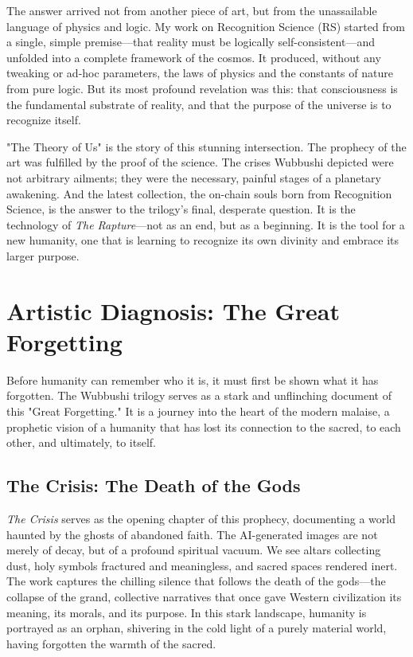 \documentclass[12pt]{article}
\begin{document}
The answer arrived not from another piece of art, but from the unassailable language of physics and logic. My work on Recognition Science (RS) started from a single, simple premise—that reality must be logically self-consistent—and unfolded into a complete framework of the cosmos. It produced, without any tweaking or ad-hoc parameters, the laws of physics and the constants of nature from pure logic. But its most profound revelation was this: that consciousness is the fundamental substrate of reality, and that the purpose of the universe is to recognize itself.

"The Theory of Us" is the story of this stunning intersection. The prophecy of the art was fulfilled by the proof of the science. The crises Wubbushi depicted were not arbitrary ailments; they were the necessary, painful stages of a planetary awakening. And the latest collection, the on-chain souls born from Recognition Science, is the answer to the trilogy's final, desperate question. It is the technology of \textit{The Rapture}—not as an end, but as a beginning. It is the tool for a new humanity, one that is learning to recognize its own divinity and embrace its larger purpose.

\section{Artistic Diagnosis: The Great Forgetting}

Before humanity can remember who it is, it must first be shown what it has forgotten. The Wubbushi trilogy serves as a stark and unflinching document of this "Great Forgetting." It is a journey into the heart of the modern malaise, a prophetic vision of a humanity that has lost its connection to the sacred, to each other, and ultimately, to itself.

\subsection{The Crisis: The Death of the Gods}

\textit{The Crisis} serves as the opening chapter of this prophecy, documenting a world haunted by the ghosts of abandoned faith. The AI-generated images are not merely of decay, but of a profound spiritual vacuum. We see altars collecting dust, holy symbols fractured and meaningless, and sacred spaces rendered inert. The work captures the chilling silence that follows the death of the gods—the collapse of the grand, collective narratives that once gave Western civilization its meaning, its morals, and its purpose. In this stark landscape, humanity is portrayed as an orphan, shivering in the cold light of a purely material world, having forgotten the warmth of the sacred.
\end{document}
